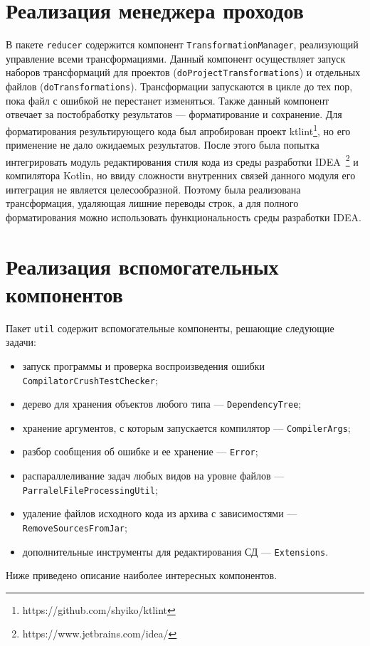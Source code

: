 \section{Реализация менеджера проходов}
В пакете \texttt{reducer} содержится компонент \texttt{TransformationManager}, реализующий управление всеми трансформациями. Данный компонент осуществляет запуск наборов трансформаций для проектов (\texttt{doProjectTransformations}) и отдельных файлов (\texttt{doTransformations}). Трансформации запускаются в цикле до тех пор, пока файл с ошибкой не перестанет изменяться. Также данный компонент отвечает за постобработку результатов --- форматирование и сохранение.  Для форматирования результирующего кода был апробирован проект ktlint\footnote{https://github.com/shyiko/ktlint}, но его применение не дало ожидаемых результатов. После этого была попытка интегрировать модуль редактирования стиля кода из среды разработки IDEA~\footnote{https://www.jetbrains.com/idea/} и компилятора Kotlin, но ввиду сложности внутренних связей данного модуля его интеграция не является целесообразной. Поэтому была реализована трансформация, удаляющая лишние переводы строк, а для полного форматирования можно использовать функциональность среды разработки IDEA. 

\section{Реализация вспомогательных компонентов}
Пакет \texttt{util} содержит вспомогательные компоненты, решающие следующие задачи:
\begin{itemize}
	\item запуск программы и проверка воспроизведения ошибки \texttt{CompilatorCrushTestChecker};
	\item дерево для хранения объектов любого типа --- \texttt{DependencyTree};
	\item хранение аргументов, с которым запускается компилятор --- \texttt{CompilerArgs};
	\item разбор сообщения об ошибке и ее хранение --- \texttt{Error};
	\item распараллеливание задач любых видов на уровне файлов --- \texttt{ParralelFileProcessingUtil};
	\item удаление файлов исходного кода из архива с зависимостями --- \texttt{RemoveSourcesFromJar};
	\item дополнительные инструменты для редактирования СД --- \texttt{Extensions}.
\end{itemize}
Ниже приведено описание наиболее интересных компонентов.

